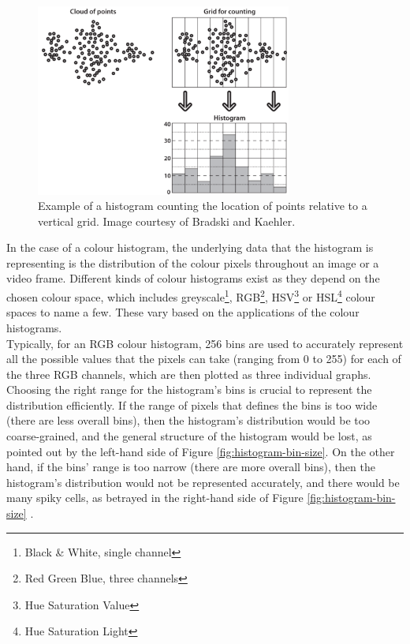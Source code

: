 \begin{figure}[h]
\centerline{\includegraphics[width=0.75\textwidth]{figures/litsurvey/histogram_general_example.png}}
\caption{\label{fig:histogram-general-example}Example of a histogram counting the location of points relative to a vertical grid. Image courtesy of Bradski and Kaehler.}
\end{figure}

In the case of a colour histogram, the underlying data that the histogram is representing is the distribution of the colour pixels throughout an image or a video frame. Different kinds of colour histograms exist as they depend on the chosen colour space, which includes greyscale\footnote{Black \& White, single channel}, RGB\footnote{Red Green Blue, three channels}, HSV\footnote{Hue Saturation Value} or HSL\footnote{Hue Saturation Light} colour spaces to name a few. These vary based on the applications of the colour histograms.\\

Typically, for an RGB colour histogram, 256 bins are used to accurately represent all the possible values that the pixels can take (ranging from 0 to 255) for each of the three RGB channels, which are then plotted as three individual graphs. Choosing the right range for the histogram's bins is crucial to represent the distribution efficiently. If the range of pixels that defines the bins is too wide (there are less overall bins), then the histogram's distribution would be too coarse-grained, and the general structure of the histogram would be lost, as pointed out by the left-hand side of Figure \ref{fig:histogram-bin-size}. On the other hand, if the bins' range is too narrow (there are more overall bins), then the histogram's distribution would not be represented accurately, and there would be many spiky cells, as betrayed in the right-hand side of Figure \ref{fig:histogram-bin-size} \cite{bradski2008opencv}.

